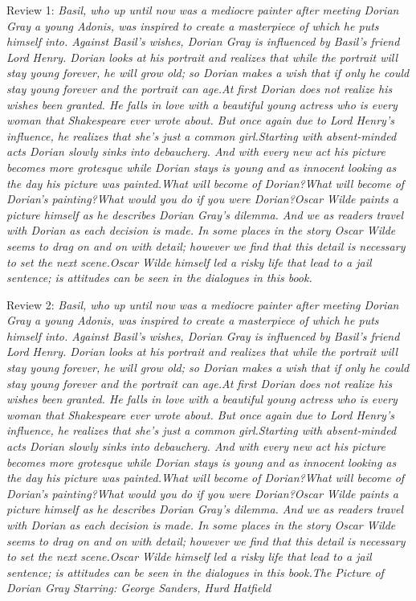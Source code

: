 \documentclass[12pt, a4paper]{article}
\begin{document}
\begin{itemize}
    {\fontsize{9pt}{11pt}\selectfont
    \item Review 1: \textit{Basil, who up until now was a mediocre painter after meeting Dorian Gray a young Adonis, was inspired to create a masterpiece of which he puts himself into. Against Basil's wishes, Dorian Gray is influenced by Basil's friend Lord Henry. Dorian looks at his portrait and realizes that while the portrait will stay young forever, he will grow old; so Dorian makes a wish that if only he could stay young forever and the portrait can age.At first Dorian does not realize his wishes been granted. He falls in love with a beautiful young actress who is every woman that Shakespeare ever wrote about. But once again due to Lord Henry's influence, he realizes that she's just a common girl.Starting with absent-minded acts Dorian slowly sinks into debauchery. And with every new act his picture becomes more grotesque while Dorian stays is young and as innocent looking as the day his picture was painted.What will become of Dorian?What will become of Dorian's painting?What would you do if you were Dorian?Oscar Wilde paints a picture himself as he describes Dorian Gray's dilemma. And we as readers travel with Dorian as each decision is made. In some places in the story Oscar Wilde seems to drag on and on with detail; however we find that this detail is necessary to set the next scene.Oscar Wilde himself led a risky life that lead to a jail sentence; is attitudes can be seen in the dialogues in this book.}
    \item Review 2: \textit{Basil, who up until now was a mediocre painter after meeting Dorian Gray a young Adonis, was inspired to create a masterpiece of which he puts himself into. Against Basil's wishes, Dorian Gray is influenced by Basil's friend Lord Henry. Dorian looks at his portrait and realizes that while the portrait will stay young forever, he will grow old; so Dorian makes a wish that if only he could stay young forever and the portrait can age.At first Dorian does not realize his wishes been granted. He falls in love with a beautiful young actress who is every woman that Shakespeare ever wrote about. But once again due to Lord Henry's influence, he realizes that she's just a common girl.Starting with absent-minded acts Dorian slowly sinks into debauchery. And with every new act his picture becomes more grotesque while Dorian stays is young and as innocent looking as the day his picture was painted.What will become of Dorian?What will become of Dorian's painting?What would you do if you were Dorian?Oscar Wilde paints a picture himself as he describes Dorian Gray's dilemma. And we as readers travel with Dorian as each decision is made. In some places in the story Oscar Wilde seems to drag on and on with detail; however we find that this detail is necessary to set the next scene.Oscar Wilde himself led a risky life that lead to a jail sentence; is attitudes can be seen in the dialogues in this book.The Picture of Dorian Gray Starring: George Sanders, Hurd Hatfield}
}
\end{itemize}
\end{document}
